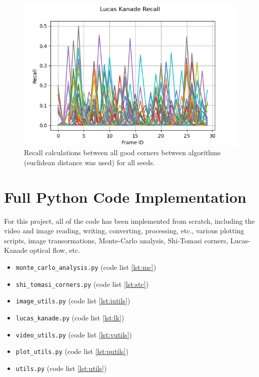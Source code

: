 \documentclass[11pt, conference, letterpaper]{IEEEtran}
\begin{document}
\begin{figure}[h!]
    \centering
    \includegraphics[width=\linewidth]{mc_images/mc_lk_recall.png}
    \caption{Recall calculations between all good corners between algorithms (euclidean distance was used) for all seeds.}
    \label{fig:mc_lk_rec}
\end{figure}


\newpage

\onecolumn
\section{Full Python Code Implementation}
For this project, all of the code has been implemented from scratch, including the video and image reading, writing, converting, processing, etc., various plotting scripts, image transormations, Monte-Carlo analysis, Shi-Tomasi corners, Lucas-Kanade optical flow, etc.

\begin{itemize}
    \item \texttt{monte\_carlo\_analysis.py} (code list \ref{lst:mc})
    \item \texttt{shi\_tomasi\_corners.py} (code list \ref{lst:stc})
    \item \texttt{image\_utils.py} (code list \ref{lst:iutils})
    \item \texttt{lucas\_kanade.py} (code list \ref{lst:lk})
    \item \texttt{video\_utils.py} (code list \ref{lst:vutils})
    \item \texttt{plot\_utils.py} (code list \ref{lst:putils})
    \item \texttt{utils.py} (code list \ref{lst:utils})
\end{itemize}
\end{document}
